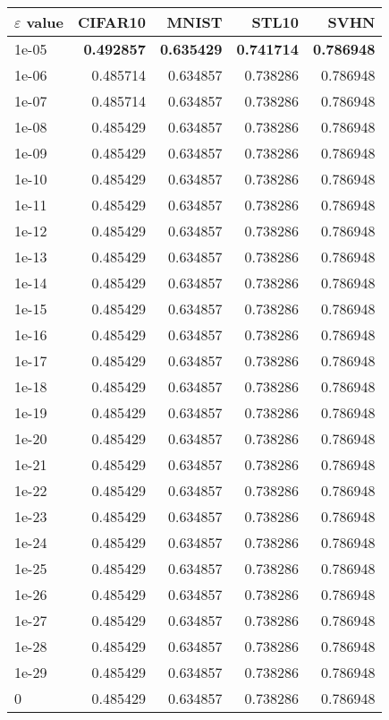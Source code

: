 \documentclass{article}
\begin{document}
\begin{table}[th]
\centering
\begin{tabular}{| l | r | r | r | r |}
\hline
$ \varepsilon$ value & CIFAR10 & MNIST & STL10 & SVHN \\ \hline
1e-05 & \textbf{0.492857}& \textbf{0.635429} & \textbf{0.741714} & \textbf{0.786948} \\ \hline
1e-06 & 0.485714 & 0.634857 & 0.738286 & 0.786948 \\ \hline
1e-07 & 0.485714 & 0.634857 & 0.738286 & 0.786948 \\ \hline
1e-08 & 0.485429 & 0.634857 & 0.738286 & 0.786948 \\ \hline
1e-09 & 0.485429 & 0.634857 & 0.738286 & 0.786948 \\ \hline
1e-10 & 0.485429 & 0.634857 & 0.738286 & 0.786948 \\ \hline
1e-11 & 0.485429 & 0.634857 & 0.738286 & 0.786948 \\ \hline
1e-12 & 0.485429 & 0.634857 & 0.738286 & 0.786948 \\ \hline
1e-13 & 0.485429 & 0.634857 & 0.738286 & 0.786948 \\ \hline
1e-14 & 0.485429 & 0.634857 & 0.738286 & 0.786948 \\ \hline
1e-15 & 0.485429 & 0.634857 & 0.738286 & 0.786948 \\ \hline
1e-16 & 0.485429 & 0.634857 & 0.738286 & 0.786948 \\ \hline
1e-17 & 0.485429 & 0.634857 & 0.738286 & 0.786948 \\ \hline
1e-18 & 0.485429 & 0.634857 & 0.738286 & 0.786948 \\ \hline
1e-19 & 0.485429 & 0.634857 & 0.738286 & 0.786948 \\ \hline
1e-20 & 0.485429 & 0.634857 & 0.738286 & 0.786948 \\ \hline
1e-21 & 0.485429 & 0.634857 & 0.738286 & 0.786948 \\ \hline
1e-22 & 0.485429 & 0.634857 & 0.738286 & 0.786948 \\ \hline
1e-23 & 0.485429 & 0.634857 & 0.738286 & 0.786948 \\ \hline
1e-24 & 0.485429 & 0.634857 & 0.738286 & 0.786948 \\ \hline
1e-25 & 0.485429 & 0.634857 & 0.738286 & 0.786948 \\ \hline
1e-26 & 0.485429 & 0.634857 & 0.738286 & 0.786948 \\ \hline
1e-27 & 0.485429 & 0.634857 & 0.738286 & 0.786948 \\ \hline
1e-28 & 0.485429 & 0.634857 & 0.738286 & 0.786948 \\ \hline
1e-29 & 0.485429 & 0.634857 & 0.738286 & 0.786948 \\ \hline
0 & 0.485429 & 0.634857 & 0.738286 & 0.786948 \\ \hline
\end{tabular}\end{table}
\end{document}
